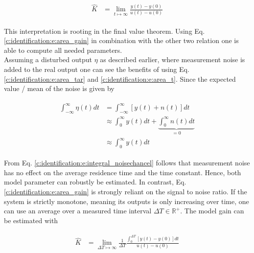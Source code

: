 \begin{align}
\begin{split}
\hat{K} &= \lim_{t\mapsto \infty} \frac{y(t)-y(0)}{u(t)-u(0)}
\end{split}
\label{c:identification:e:area_gain}
\end{align}

This interpretation is rooting in the final value theorem. Using Eq. \ref{c:identification:e:area_gain} in combination with the other two relation one is able to compute all needed parameters.\\

Assuming a disturbed output $\eta$ as described earlier, where measurement noise is added to the real output one can see the benefits of using Eq.\ref{c:identification:e:area_tar} and \ref{c:identification:e:area_t}. Since the expected value / mean of the noise is given by 

\begin{align}
\begin{split}
\int_{-\infty}^{\infty} \eta \left( t \right) dt&= \int_{-\infty}^{\infty} \left[ y \left(t \right) + n\left(t\right) \right] dt \\
&\approx \int_{0}^{\infty}  y \left(t \right) dt + \underbrace{\int_{0}^{\infty} n\left(t\right) dt }_{= 0}\\
&\approx \int_{0}^{\infty}  y \left(t \right) dt
\end{split}
\label{c:identification:e:integral_noisechancel}
\end{align}

From Eq. \ref{c:identification:e:integral_noisechancel} follows that measurement noise has no effect on the average residence time and the time constant. Hence, both model parameter can robustly be estimated. In contrast, Eq.\ref{c:identification:e:area_gain} is strongly reliant on the signal to noise ratio. If the system is strictly monotone, meaning its outputs is only increasing over time, one can use an average over a measured time interval $\Delta T \in \mathbb{R}^+$. The model gain can be estimated with

\begin{align}
\begin{split}
\hat{K} &= \lim_{\Delta T\mapsto \infty} \frac{1}{\Delta T} \frac{\int_{0}^{\Delta T} \left[ y \left( t\right) - y\left(0\right)\right] dt}{u \left( t \right)-u \left( 0 \right)}
\end{split}
\label{c:identification:e:area_averagegain}
\end{align}

